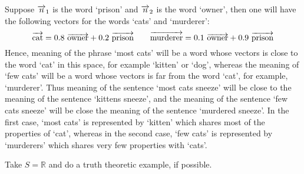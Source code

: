 Suppose $\overrightarrow{n}_1$ is the word  `prison' and $\overrightarrow{n}_2$ is the word `owner', then one will have the following vectors for the words `cats' and `murderer':
\[
\overrightarrow{\text{cat}} = 0.8 \  \overrightarrow{\text{owner}} + 0.2 \ \overrightarrow{\text{prison}}
\qquad
\overrightarrow{\text{murderer}} = 0.1\  \overrightarrow{\text{owner}} + 0.9 \  \overrightarrow{\text{prison}}
\]
Hence,  meaning of the phrase   `most cats' will  be a word whose vectors is close to the word `cat' in this space, for example `kitten' or `dog', whereas the meaning of `few cats' will be a word whose vectors is far from the word `cat', for example, `murderer'. Thus meaning of the sentence `most cats sneeze' will be close to the meaning of the sentence `kittens sneeze', and the meaning of the sentence `few cats sneeze' will be close the meaning of the sentence `murdered sneeze'.  In the first case, `most cats' is represented by `kitten' which shares most of the properties of `cat', whereas in the second case, `few cats' is represented by `murderers' which shares very few properties with `cats'. 

Take $S = \mathbb{R}$ and do a truth theoretic example, if possible. 


